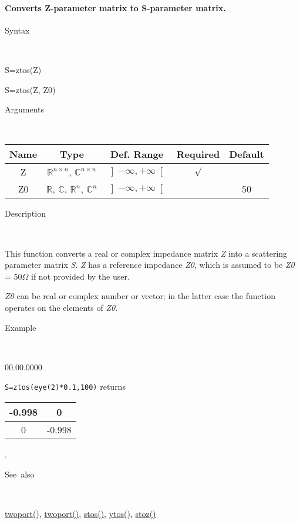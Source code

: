 \paragraph{\label{par:ztos}Converts Z-parameter matrix to S-parameter matrix.}

\begin{description}
\item [Syntax]~
\end{description}
S=ztos(Z)

\noindent S=ztos(Z, Z0)

\begin{description}
\item [Arguments]~
\end{description}
\begin{tabular}{|c|c|c|c|c|}
\hline 
Name&
Type&
Def. Range&
Required&
Default\tabularnewline
\hline
\hline 
Z&
$\mathbb{R}^{n\times n}$, $\mathbb{C}^{n\times n}$&
$\left]-\infty,+\infty\right[$&
$\surd$&
\tabularnewline
\hline
Z0&
$\mathbb{R}$, $\mathbb{C}$, $\mathbb{R}^{n}$, $\mathbb{C}^{n}$&
$\left]-\infty,+\infty\right[$&
&
50\tabularnewline
\hline
\end{tabular}

\begin{description}
\item [Description]~
\end{description}
This function converts a real or complex impedance matrix \textit{Z}
into a scattering parameter matrix \textit{S}. \textit{Z} has a reference
impedance \textit{Z0}, which is assumed to be \textit{Z0} = 50$\Omega$
if not provided by the user.

\noindent \textit{Z0} can be real or complex number or vector; in
the latter case the function operates on the elements of \textit{Z0}.

\begin{description}
\item [Example]~
\end{description}
\begin{lyxlist}{00.00.0000}
\item [\texttt{S=ztos(eye(2){*}0.1,100)}]returns \begin{tabular}{|c|c|}
\hline 
-0.998&
0\tabularnewline
\hline
0&
-0.998\tabularnewline
\hline
\end{tabular}.
\end{lyxlist}
\begin{description}
\item [See~also]~
\end{description}
\textcolor{blue}{\hyperlink{twoport}{twoport()}}\textcolor{black}{,}
\textcolor{blue}{\hyperlink{twoport}{twoport()}}\textcolor{black}{,}
\textcolor{blue}{\hyperlink{stos}{stos()}}\textcolor{black}{,} \textcolor{blue}{\hyperlink{ytos}{ytos()}}\textcolor{black}{,}
\textcolor{blue}{\hyperlink{stoz}{stoz()}}



